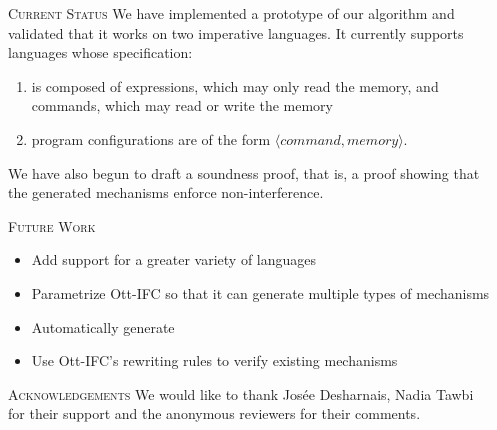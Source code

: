 \documentclass[final]{beamer}
\newlength{\onecolwid}
\newlength{\twocolwid}
\begin{document}
\begin{frame}[fragile]
\begin{columns}[t]
\begin{column}{\twocolwid}





\end{column}

\begin{column}{\onecolwid}

\begin{block}{\textsc{Current Status}}
We have implemented a prototype of our algorithm and validated that it works on two imperative languages. It currently supports languages whose specification: 
\begin{enumerate}
\item is composed of expressions, which may only read the memory, and commands, which may read or write the memory
\item program configurations are of the form $\langle command, memory\rangle$. 
\end{enumerate}

We have also begun to draft a soundness proof, that is, a proof showing that the generated mechanisms enforce non-interference.


\end{block}

\begin{block}{\textsc{Future Work}}
    \begin{itemize}
        \item Add support for a greater variety of languages
        \item Parametrize Ott-IFC so that it can generate multiple types of mechanisms
        \item Automatically generate 
        \item Use Ott-IFC's rewriting rules to verify existing mechanisms
    \end{itemize}
\end{block}

    \begin{block}{\textsc{Acknowledgements}}
        We would like to thank Josée Desharnais, Nadia Tawbi for their support and the anonymous reviewers for their comments.
        
    \end{block}
\end{column}
\end{columns}
\end{frame}
\end{document}
